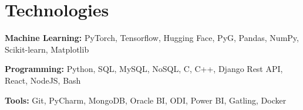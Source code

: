 \section{Technologies}
       
    \begin{onecolentry}
        \textbf{Machine Learning:} PyTorch, Tensorflow, Hugging Face, PyG, Pandas, NumPy, Scikit-learn, Matplotlib
    \end{onecolentry}

    \vspace{0.2 cm}

    \begin{onecolentry}
        \textbf{Programming:} Python, SQL, MySQL, NoSQL, C, C++, Django Rest API, React, NodeJS, Bash
    \end{onecolentry}

    \vspace{0.2 cm}

    \begin{onecolentry}
        \textbf{Tools:} Git, PyCharm, MongoDB, Oracle BI, ODI, Power BI, Gatling, Docker
    \end{onecolentry}
